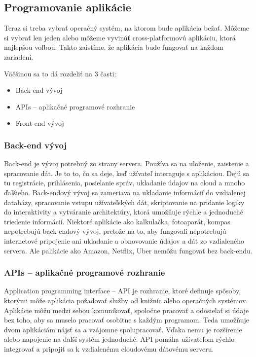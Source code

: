 \documentclass[10pt,twoside,slovak,a4paper]{article}
\begin{document}
\cite{buildfire, wiki2}


\subsection{Programovanie aplikácie}
\quad Teraz si treba vybrať operačný systém, na ktorom bude aplikácia bežať. Môžeme si vybrať len jeden alebo môžeme vyvinúť cross-platformovú aplikáciu, ktorá najlepšou voľbou. Takto zaistíme, že aplikácia bude fungovať na každom zariadení.	\cite{buildfire}

Väčšinou sa to dá rozdeliť na 3 časti:
\begin{itemize}
\item Back-end vývoj
\item APIs – aplikačné programové rozhranie
\item Front-end vývoj
\end{itemize}


\subsubsection{Back-end vývoj}
\quad Back-end je vývoj potrebný zo strany servera. Používa sa na uloženie, zaistenie a spracovanie dát. Je to to, čo sa deje, keď užívateľ interaguje s aplikáciou. Dejú sa tu registrácie, prihlásenia, posielanie správ, ukladanie údajov na cloud a mnoho ďalšieho. Back-endový vývoj sa zameriava na ukladanie informácií do vzdialenej databázy, spracovanie vstupu užívateľských dát, skriptovanie na pridanie logiky do interaktivity a vytváranie architektúry, ktorá umožňuje rýchle a jednoduché triedenie informácií. Niektoré aplikácie ako kalkulačka, fotoaparát, kompas nepotrebujú back-endový vývoj, pretože na to, aby fungovali nepotrebujú internetové pripojenie ani ukladanie a obnovovanie údajov a dát zo vzdialeného servera. Ale palikácie ako Amazon, Netflix, Uber nemôžu fungovať bez back-endu.

\cite{openxcell, pixelfield}


\subsubsection{APIs – aplikačné programové rozhranie}
\quad Application programming interface – API je rozhranie, ktoré definuje spôsoby, ktorými môže aplikácia požadovať služby od knižníc alebo operačných systémov. Aplikácie môžu medzi sebou komunikovať, spoločne pracovať a odosielať si údaje bez toho, aby sa muselo pracovať osobitne s každým programom. Teda umožňuje dvom aplikáciám nájsť sa a vzájomne spolupracovať. Vďaka nemu je rozšírenie alebo napojenie na ďalší systém jednoduché. API pomáha užívateľom rýchlo integrovať a pripojiť sa k vzdialenému cloudovému dátovému serveru. 
\end{document}
